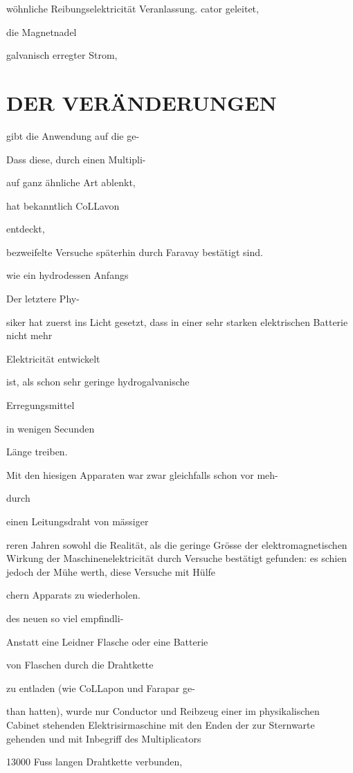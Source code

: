 \documentclass[12pt,a4paper]{article}
\begin{document}
wöhnliche Reibungselektricität Veranlassung. cator geleitet,

die Magnetnadel

galvanisch erregter Strom,

\section*{DER VERÄNDERUNGEN}
gibt die Anwendung auf die ge-

Dass diese, durch einen Multipli-

auf ganz ähnliche Art ablenkt,

hat bekanntlich CoLLavon

entdeckt,

bezweifelte Versuche späterhin durch Faravay bestätigt sind.

wie ein hydrodessen Anfangs

Der letztere Phy-

siker hat zuerst ins Licht gesetzt, dass in einer sehr starken elektrischen Batterie nicht mehr

Elektricität entwickelt

ist, als schon sehr geringe hydrogalvanische

Erregungsmittel

in wenigen Secunden

Länge treiben.

Mit den hiesigen Apparaten war zwar gleichfalls schon vor meh-

durch

einen Leitungsdraht von mässiger

reren Jahren sowohl die Realität, als die geringe Grösse der elektromagnetischen Wirkung der Maschinenelektricität durch Versuche bestätigt gefunden: es schien jedoch der Mühe werth, diese Versuche mit Hülfe

chern Apparats zu wiederholen.

des neuen so viel empfindli-

Anstatt eine Leidner Flasche oder eine Batterie

von Flaschen durch die Drahtkette

zu entladen (wie CoLLapon und Farapar ge-

than hatten), wurde nur Conductor und Reibzeug einer im physikalischen Cabinet stehenden Elektrisirmaschine mit den Enden der zur Sternwarte gehenden und mit Inbegriff des Multiplicators

13000 Fuss langen Drahtkette verbunden,
\end{document}
